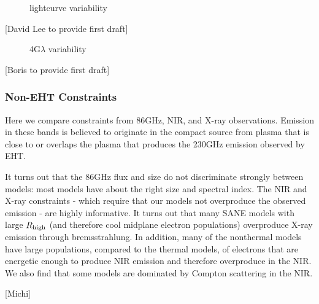 
\begin{figure}
  \caption{lightcurve variability}
  \label{fig:cmp_ALMA_var}
\end{figure}

[David Lee to provide first draft]


\begin{figure}
  \caption{4G$\lambda$ variability}
  \label{fig:cmp_VLBI_var}
\end{figure}

[Boris to provide first draft]

\subsubsection{Non-EHT Constraints}

Here we compare constraints from 86GHz, NIR, and X-ray observations.  Emission in these bands is believed to originate in the compact source from plasma that is close to or overlaps the plasma that produces the 230GHz emission observed by EHT.

It turns out that the 86GHz flux and size do not discriminate strongly between models: most models have about the right size and spectral index.  The NIR and X-ray constraints - which require that our models not overproduce the observed emission - are highly informative.  It turns out that many SANE models with large $R_\mathrm{high}$ (and therefore cool midplane electron populations) overproduce X-ray emission through bremsstrahlung.  In addition, many of the nonthermal models have large populations, compared to the thermal models, of electrons that are energetic enough to produce NIR emission and therefore overproduce in the NIR.   We also find that some models are dominated by Compton scattering in the NIR.



[Michi]


